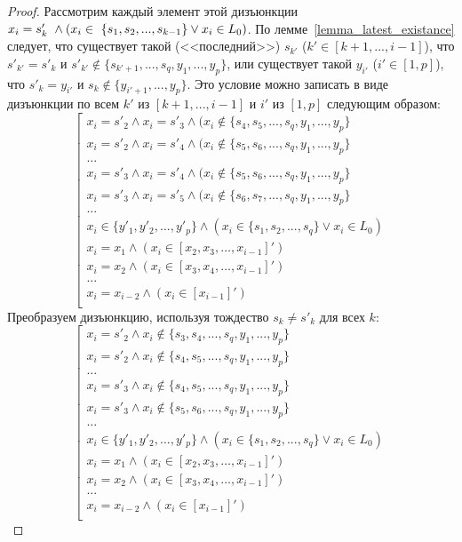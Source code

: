\begin{proof}
  Рассмотрим каждый элемент этой дизъюнкции $x_i = s'_k~\wedge\\(x_i
  \in~\{s_1, s_2, ..., s_{k-1}\} \vee x_i \in L_0)$. По
  лемме~\ref{lemma_latest_existance} следует, что существует такой
  (<<последний>>) $s_{k'}$ ($k' \in [k+1, ..., i-1]$), что $s'_{k'} = s'_k$ и
  $s'_{k'} \notin \{s_{k'+1}, ..., s_q, y_1, ..., y_p\}$, или существует такой
  $y_{i'}$ ($i' \in [1, p]$), что $s'_k = y_{i'}$ и $s_k \notin
  \{y_{i'+1}, ...,y_p\}$. Это условие можно записать в виде
  дизъюнкции по всем $k'$ из $[k+1, ..., i-1]$ и $i'$ из $[1, p]$
  следующим образом:
  $$\left[\begin{array}{l}
    x_i = s'_2 \wedge x_i = s'_3 \wedge (x_i \notin\{s_4, s_5, ...,
    s_q, y_1, ..., y_p\}\\
    x_i = s'_2 \wedge x_i = s'_4 \wedge (x_i \notin\{s_5, s_6, ...,
    s_q, y_1, ..., y_p\}\\
    ...\\
    x_i = s'_3 \wedge x_i = s'_4 \wedge (x_i \notin\{s_5, s_6, ...,
    s_q, y_1, ..., y_p\}\\
    x_i = s'_3 \wedge x_i = s'_5 \wedge (x_i \notin\{s_6, s_7, ...,
    s_q, y_1, ..., y_p\}\\
    ...\\
    x_i \in \{y'_1, y'_2, ..., y'_p\} \wedge (x_i \in \{s_1, s_2, ...,
    s_q\} \vee x_i \in L_0)\\
    x_i = x_1 \wedge (x_i \in [x_2, x_3, \dots, x_{i-1}]')\\
    x_i = x_2 \wedge (x_i \in [x_3, x_4, \dots, x_{i-1}]')\\
    ...\\
    x_i = x_{i-2} \wedge (x_i \in [x_{i-1}]')\\
  \end{array}\right.$$
  Преобразуем дизъюнкцию, используя тождество $s_k \neq s'_k$ для всех
  $k$:
  $$\left[\begin{array}{l}
    x_i = s'_2 \wedge x_i \notin\{s_3, s_4, ..., s_q, y_1, ..., y_p\}\\
    x_i = s'_2 \wedge x_i \notin\{s_4, s_5, ..., s_q, y_1, ..., y_p\}\\
    ...\\
    x_i = s'_3 \wedge x_i \notin\{s_4, s_5, ..., s_q, y_1, ..., y_p\}\\
    x_i = s'_3 \wedge x_i \notin\{s_5, s_6, ..., s_q, y_1, ..., y_p\}\\
    ...\\
    x_i \in \{y'_1, y'_2, ..., y'_p\} \wedge (x_i \in \{s_1, s_2, ...,
    s_q\} \vee x_i \in L_0)\\
    x_i = x_1 \wedge (x_i \in [x_2, x_3, \dots, x_{i-1}]')\\
    x_i = x_2 \wedge (x_i \in [x_3, x_4, \dots, x_{i-1}]')\\
    ...\\
    x_i = x_{i-2} \wedge (x_i \in [x_{i-1}]')\\
  \end{array}\right.$$


\end{proof}
